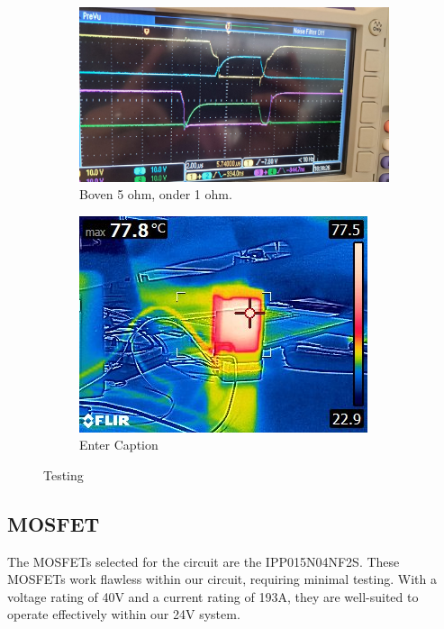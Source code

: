\begin{figure}[H]
    \centering
    \hfill
    \begin{subfigure}{0.42\textwidth}
        \includegraphics[width=\linewidth]{img//GateDriver/WhatsApp Image 2024-03-18 at 18.38.31_9fd81adb.jpg}
        \caption{Boven 5 ohm, onder 1 ohm.}
         \label{fig:smallshort}
    \end{subfigure}
    \hfill
    \begin{subfigure}{0.32\textwidth}
    \includegraphics[width=\linewidth]{img/WhatsApp Image 2024-03-28 at 18.31.53_bad388f9.jpg}
    \caption{Enter Caption}
    \label{fig:BLDCHEAT}
    \end{subfigure}
    \hfill
  \label{fig:Buck}
  \caption{Testing}
\end{figure}


\subsection{MOSFET}\label{MOSFET}
The MOSFETs selected for the circuit are the IPP015N04NF2S\cite{infineon-ipp015n04nf2s-datasheet}. These MOSFETs work flawless within our circuit, requiring minimal testing. With a voltage rating of 40V and a current rating of 193A, they are well-suited to operate effectively within our 24V system.

